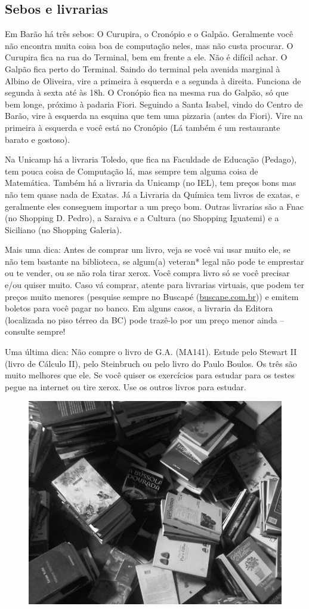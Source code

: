 \subsection{Sebos e livrarias}

Em Barão há três sebos: O Curupira, o Cronópio e o Galpão. Geralmente você não
encontra muita coisa boa de computação neles, mas não custa procurar. O Curupira
fica na rua do Terminal, bem em frente a ele. Não é difícil achar. O Galpão fica
perto do Terminal. Saindo do terminal pela avenida marginal à Albino de
Oliveira, vire a primeira à esquerda e a segunda à direita. Funciona de segunda
à sexta até às 18h. O Cronópio fica na mesma rua do Galpão, só que bem longe,
próximo à padaria Fiori. Seguindo a Santa Isabel, vindo do Centro de Barão, vire
à esquerda na esquina que tem uma pizzaria (antes da Fiori). Vire na primeira à
esquerda e você está no Cronópio (Lá também é um restaurante barato e gostoso).

Na Unicamp há a livraria Toledo, que fica na Faculdade de Educação (Pedago), tem
pouca coisa de Computação lá, mas sempre tem alguma coisa de Matemática. Também
há a livraria da Unicamp (no IEL), tem preços bons mas não tem quase nada de
Exatas. Já a Livraria da Química tem livros de exatas, e geralmente eles
conseguem importar a um preço bom. Outras livrarias são a Fnac (no Shopping D.
Pedro), a Saraiva e a Cultura (no Shopping Iguatemi) e a Siciliano (no Shopping
Galeria).

Mais uma dica: Antes de comprar um livro, veja se você vai usar muito ele, se
não tem bastante na biblioteca, se algum(a) veteran* legal não pode te emprestar ou
te vender, ou se não rola tirar xerox. Você compra livro só se você precisar
e/ou quiser muito. Caso vá comprar, atente para livrarias virtuais, que podem
ter preços muito menores (pesquise sempre no Buscapé (\url{buscape.com.br})) e
emitem boletos para você pagar no banco.  Em alguns casos, a livraria da Editora
(localizada no piso térreo da BC) pode trazê-lo por um preço menor ainda --
consulte sempre!

Uma última dica: Não compre o livro de G.A. (MA141). Estude pelo Stewart II
(livro de Cálculo II), pelo Steinbruch ou pelo livro do Paulo Boulos. Os três
são muito melhores que ele. Se você quiser os exercícios para estudar para os
testes pegue na internet ou tire xerox. Use os outros livros para estudar.

\begin{figure}[h!]
    \centering
    \includegraphics[width=.45\textwidth]{img/barao/sebo.jpg}
\end{figure}

